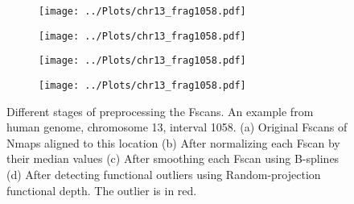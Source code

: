 \begin{figure}[H]
\centering
\begin{subfigure}{0.23\linewidth}
\texttt{[image: ../Plots/chr13\_frag1058.pdf]}
\caption{}
\label{fig:Smooth_a}
\end{subfigure}
\begin{subfigure}{0.23\linewidth}
\texttt{[image: ../Plots/chr13\_frag1058.pdf]}
\caption{}
\label{fig:Smooth_b}
\end{subfigure}
\begin{subfigure}{0.23\linewidth}
\texttt{[image: ../Plots/chr13\_frag1058.pdf]}
\caption{}
\label{fig:Smooth_c}
\end{subfigure}
\begin{subfigure}{0.23\linewidth}
\texttt{[image: ../Plots/chr13\_frag1058.pdf]}
\caption{}
\label{fig:Smooth_d}
\end{subfigure}
\caption{Different stages of preprocessing the Fscans. An example from human genome, chromosome 13, interval 1058. (a) Original Fscans of Nmaps aligned to this location (b) After normalizing each Fscan by their median values (c) After smoothing each Fscan using B-splines (d) After detecting functional outliers using Random-projection functional depth. The outlier is in red.} 
\label{fig:Smooth}
\end{figure}

